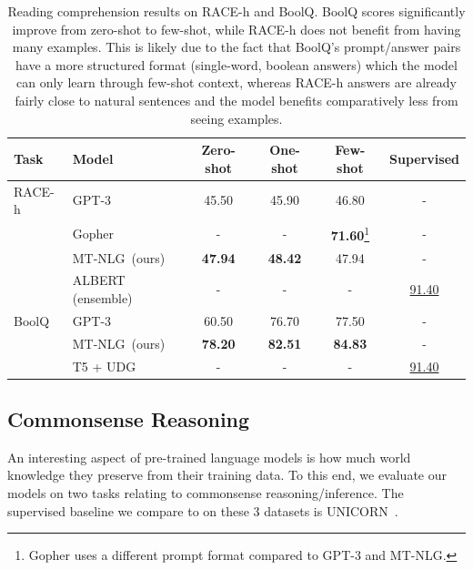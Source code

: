 \documentclass[11pt]{article}
\newcommand{\ours}{MT-NLG}
\begin{document}
\begin{savenotes}
\begin{table}[t]
\centering
\small
\begin{tabular}{l l c c c c}
 \toprule
 \textbf{Task} & \textbf{Model} &  \textbf{Zero-shot}  &  \textbf{One-shot} &  \textbf{Few-shot} & \textbf{Supervised} \\
 \midrule
 RACE-h & GPT-3	&	45.50	&	45.90	&	46.80 & -	\\
        & Gopher  &   -   &   -   &  \textbf{71.60}\footnote{Gopher uses a different prompt format compared to GPT-3 and \ours.}  &  -   \\
        & \ours~(ours)  &   \textbf{47.94}   &   \textbf{48.42}   &   47.94 & -   \\
        \cmidrule{2-6}
        & ALBERT (ensemble)  &   -   &   -   &   - &  \underline{91.40}   \\
 \midrule
 BoolQ  & GPT-3	&	60.50	&	76.70	&	77.50 & -	\\
         & \ours~(ours)  &   \textbf{78.20}   &   \textbf{82.51}   &   \textbf{84.83} & -   \\
        \cmidrule{2-6}
        & T5 + UDG  &   -   &   -   &   - &  \underline{91.40}   \\
 \bottomrule
\end{tabular}
\caption{Reading comprehension results on RACE-h and BoolQ. BoolQ scores significantly improve from zero-shot to few-shot, while RACE-h does not benefit from having many examples. This is likely due to the fact that BoolQ's prompt/answer pairs have a more structured format (single-word, boolean answers) which the model can only learn through few-shot context, whereas RACE-h answers are already fairly close to natural sentences and the model benefits comparatively less from seeing examples.}
\label{tab:reading-perf}
\end{table}
\end{savenotes}

\subsection{Commonsense Reasoning}

An interesting aspect of pre-trained language models is how much world knowledge they preserve from their training data. To this end, we evaluate our models on two tasks relating to commonsense reasoning/inference. The supervised baseline we compare to on these 3 datasets is UNICORN~\cite{Lourie2021UNICORNOR}.
\end{document}
